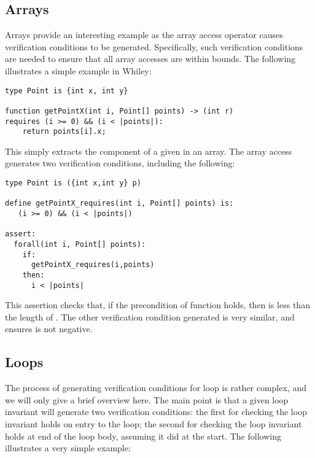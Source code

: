 \subsection{Arrays}

Arrays provide an interesting example as the array access operator
causes verification conditions to be generated.  Specifically, such
verification conditions are needed to ensure that all array accesses
are within bounds.  The following illustrates a simple example in
Whiley:

\begin{tcolorbox}\begin{lstlisting}[language=Whiley]
type Point is {int x, int y}

function getPointX(int i, Point[] points) -> (int r)
requires (i >= 0) && (i < |points|):
    return points[i].x;
\end{lstlisting}\end{tcolorbox}

This simply extracts the  component of a given
 in an array.  The array access generates two
verification conditions, including the following:
\begin{tcolorbox}\begin{lstlisting}[language=WyAL]
type Point is ({int x,int y} p)

define getPointX_requires(int i, Point[] points) is:
   (i >= 0) && (i < |points|)

assert:
  forall(int i, Point[] points):
    if:
      getPointX_requires(i,points)
    then:
      i < |points|
\end{lstlisting}\end{tcolorbox}

This assertion checks that, if the precondition of function
 holds, then  is less than the
length of .  The other verification condition
generated is very similar, and ensures  is not negative.

\subsection{Loops}

The process of generating verification conditions for loop is rather
complex, and we will only give a brief overview here.  The main point
is that a given loop invariant will generate two verification
conditions: the first for checking the loop invariant holds on entry
to the loop; the second for checking the loop invariant holds at end
of the loop body, assuming it did at the start.  The following
illustrates a very simple example:

